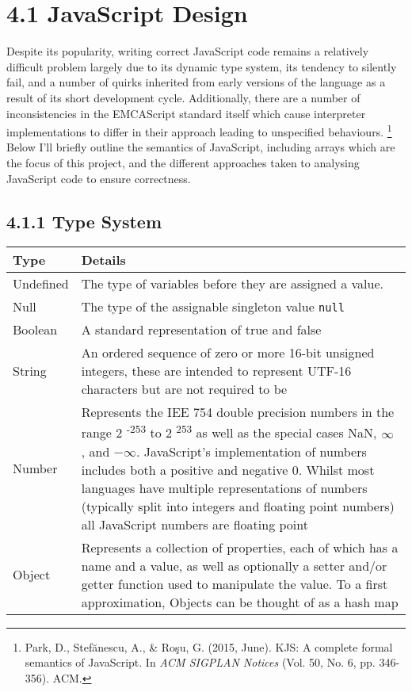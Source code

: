 \documentclass[]{article}
\begin{document}
\hypertarget{header-n132}{%
\section{4.1 JavaScript Design}\label{header-n132}}

Despite its popularity, writing correct JavaScript code remains a
relatively difficult problem largely due to its dynamic type system, its
tendency to silently fail, and a number of quirks inherited from early
versions of the language as a result of its short development cycle.
Additionally, there are a number of inconsistencies in the EMCAScript
standard itself which cause interpreter implementations to differ in
their approach leading to unspecified behaviours. \footnote{Park, D.,
  Stefănescu, A., \& Roşu, G. (2015, June). KJS: A complete formal
  semantics of JavaScript. In \emph{ACM SIGPLAN Notices} (Vol. 50, No.
  6, pp. 346-356). ACM.} Below I'll briefly outline the semantics of
JavaScript, including arrays which are the focus of this project, and
the different approaches taken to analysing JavaScript code to ensure
correctness.

\hypertarget{header-n135}{%
\subsection{4.1.1 Type System}\label{header-n135}}

\begin{longtable}[]{@{}ll@{}}
\toprule
Type & Details\tabularnewline
\midrule
\endhead
Undefined & The type of variables before they are assigned a
value.\tabularnewline
Null & The type of the assignable singleton value
\texttt{null}\tabularnewline
Boolean & A standard representation of true and false\tabularnewline
String & An ordered sequence of zero or more 16-bit unsigned integers,
these are intended to represent UTF-16 characters but are not required
to be\tabularnewline
Number & Represents the IEE 754 double precision numbers in the range 2
\textsuperscript{-253} to 2 \textsuperscript{253} as well as the special
cases NaN, \(\infty\) , and \( -\infty\). JavaScript's implementation of
numbers includes both a positive and negative 0. Whilst most languages
have multiple representations of numbers (typically split into integers
and floating point numbers) all JavaScript numbers are floating
point\tabularnewline
Object & Represents a collection of properties, each of which has a name
and a value, as well as optionally a setter and/or getter function used
to manipulate the value. To a first approximation, Objects can be
thought of as a hash map\tabularnewline
\bottomrule
\end{longtable}
\end{document}

